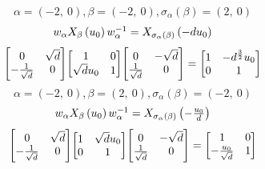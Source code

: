 \documentclass[11pt]{article}
\theoremstyle{definition}
\begin{document}
\providecommand{\scaletoalign}[2]{%
  \sbox0{$#2$}%
  \ifdim\wd0>#1\relax 
    \resizebox{#1}{!}{\usebox0}%
  \else 
    \usebox0%
  \fi 
}
\[
\alpha = \left( -2, \  0\right), \beta = \left( -2, \  0\right), \sigma_{\alpha}(\beta) = \left( 2, \  0\right)
\]
\[
\scaletoalign{\textwidth}{w_{\alpha} X_{\beta}\left(u_{0}\right) w_{\alpha}^{-1} = X_{\sigma_{\alpha}\left(\beta\right)}\left(- d u_{0}\right)}
\]
\[
\scaletoalign{\textwidth}{{\left[\begin{matrix}0 & \sqrt{d}\\- \frac{1}{\sqrt{d}} & 0\end{matrix}\right]} {\left[\begin{matrix}1 & 0\\\sqrt{d} u_{0} & 1\end{matrix}\right]} {\left[\begin{matrix}0 & - \sqrt{d}\\\frac{1}{\sqrt{d}} & 0\end{matrix}\right]} = {\left[\begin{matrix}1 & - d^{\frac{3}{2}} u_{0}\\0 & 1\end{matrix}\right]}}
\]
\[
\alpha = \left( -2, \  0\right), \beta = \left( 2, \  0\right), \sigma_{\alpha}(\beta) = \left( -2, \  0\right)
\]
\[
\scaletoalign{\textwidth}{w_{\alpha} X_{\beta}\left(u_{0}\right) w_{\alpha}^{-1} = X_{\sigma_{\alpha}\left(\beta\right)}\left(- \frac{u_{0}}{d}\right)}
\]
\[
\scaletoalign{\textwidth}{{\left[\begin{matrix}0 & \sqrt{d}\\- \frac{1}{\sqrt{d}} & 0\end{matrix}\right]} {\left[\begin{matrix}1 & \sqrt{d} u_{0}\\0 & 1\end{matrix}\right]} {\left[\begin{matrix}0 & - \sqrt{d}\\\frac{1}{\sqrt{d}} & 0\end{matrix}\right]} = {\left[\begin{matrix}1 & 0\\- \frac{u_{0}}{\sqrt{d}} & 1\end{matrix}\right]}}
\]
\end{document}
